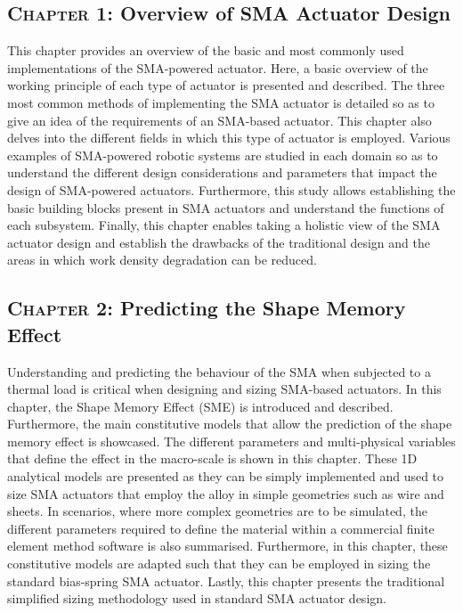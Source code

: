 \subsection*{\textsc{Chapter 1}: Overview of SMA Actuator Design}
This chapter provides an overview of the basic and most commonly used implementations of the SMA-powered actuator. Here, a basic overview of the working principle of each type of actuator is presented and described. The three most common methods of implementing the SMA actuator is detailed so as to give an idea of the requirements of an SMA-based actuator. This chapter also delves into the different fields in which this type of actuator is employed. Various examples of SMA-powered robotic systems are studied in each domain so as to understand the different design considerations and parameters that impact the design of SMA-powered actuators. Furthermore, this study allows establishing the basic building blocks present in SMA actuators and understand the functions of each subsystem. Finally, this chapter enables taking a holistic view of the SMA actuator design and establish the drawbacks of the traditional design and the areas in which work density degradation can be reduced.

\subsection*{\textsc{Chapter 2}: Predicting the Shape Memory Effect}
Understanding and predicting the behaviour of the SMA when subjected to a thermal load is critical when designing and sizing SMA-based actuators. In this chapter, the Shape Memory Effect (SME) is introduced and described. Furthermore, the main constitutive models that allow the prediction of the shape memory effect is showcased. The different parameters and multi-physical variables that define the effect in the macro-scale is shown in this chapter. These 1D analytical models are presented as they can be simply implemented and used to size SMA actuators that employ the alloy in simple geometries such as wire and sheets. In scenarios, where more complex geometries are to be simulated, the different parameters required to define the material within a commercial finite element method software is also summarised. Furthermore, in this chapter, these constitutive models are adapted such that they can be employed in sizing the standard bias-spring SMA actuator. Lastly, this chapter presents the traditional simplified sizing methodology used in standard SMA actuator design.


